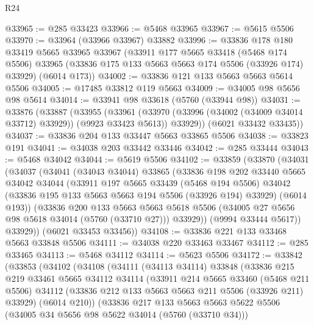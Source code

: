 \begin{lexlean}{R24}
\begin{coremodule}
@33965 := @285 @33423
@33966 := @5468 @33965
@33967 := @5615 @5506
@33970 := @33964 (@33966 @33967) @33882
@33996 := @33836
    @178
    @180
    @33419
    @5665
    @33965
    @33967
    (@33911
      @177
      @5665
      @33418
      (@5468 @174 @5506)
      @33965
      (@33836 @175 @133 @5663 @5663 @174 @5506 (@33926 @174) @33929)
      (@6014 @173))
@34002 := @33836 @121 @133 @5663 @5663 @5614 @5506
@34005 := @17485 @33812 @119 @5663
@34009 := @34005 @98 @5656 @98 @5614
@34014 := @33941 @98 @33618 (@5760 (@33944 @98))
@34031 := @33876
    (@33887
      (@33955
        (@33961
          (@33970 (@33996 (@34002 (@34009 @34014 @33712) @33929)) (@9923 @33423 @5613))
          @33929))
      (@6021 @33432 @33435))
@34037 := @33836 @204 @133 @33447 @5663 @33865 @5506
@34038 := @33823 @191
@34041 := @34038 @203 @33442 @33446
@34042 := @285 @33444
@34043 := @5468 @34042
@34044 := @5619 @5506
@34102 := @33859
    (@33870
      (@34031
        (@34037
          (@34041
            (@34043 @34044)
            @33865
            (@33836
              @198
              @202
              @33440
              @5665
              @34042
              @34044
              (@33911
                @197
                @5665
                @33439
                (@5468 @194 @5506)
                @34042
                (@33836 @195 @133 @5663 @5663 @194 @5506 (@33926 @194) @33929)
                (@6014 @193))
              (@33836
                @200
                @133
                @5663
                @5663
                @5618
                @5506
                (@34005 @27 @5656 @98 @5618 @34014 (@5760 (@33710 @27)))
                @33929))
            (@9994 @33444 @5617))
          @33929))
      (@6021 @33453 @33456))
@34108 := @33836 @221 @133 @33468 @5663 @33848 @5506
@34111 := @34038 @220 @33463 @33467
@34112 := @285 @33465
@34113 := @5468 @34112
@34114 := @5623 @5506
@34172 := @33842
    (@33853
      (@34102
        (@34108
          (@34111
            (@34113 @34114)
            @33848
            (@33836
              @215
              @219
              @33461
              @5665
              @34112
              @34114
              (@33911
                @214
                @5665
                @33460
                (@5468 @211 @5506)
                @34112
                (@33836 @212 @133 @5663 @5663 @211 @5506 (@33926 @211) @33929)
                (@6014 @210))
              (@33836
                @217
                @133
                @5663
                @5663
                @5622
                @5506
                (@34005 @34 @5656 @98 @5622 @34014 (@5760 (@33710 @34)))

\end{coremodule}
\end{lexlean}

